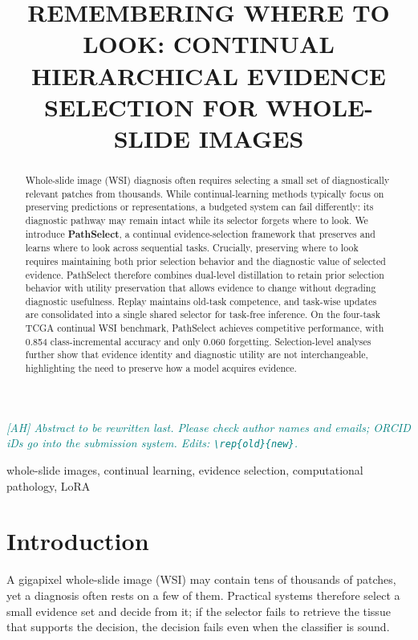 \documentclass{article}
\title{REMEMBERING WHERE TO LOOK: CONTINUAL HIERARCHICAL EVIDENCE SELECTION FOR WHOLE-SLIDE IMAGES}
\newcommand{\note}[1]{\textcolor{teal}{\textit{[AH] #1}}}     %
\begin{document}
\ninept
\maketitle

\note{Abstract to be rewritten last. Please check author names and emails; ORCID iDs go into the submission system. Edits: \texttt{\textbackslash rep\{old\}\{new\}}.}

\begin{abstract}
Whole-slide image (WSI) diagnosis often requires selecting a small set of diagnostically relevant patches from thousands. While continual-learning methods typically focus on preserving predictions or representations, a budgeted system can fail differently: its diagnostic pathway may remain intact while its selector forgets where to look. We introduce \textbf{PathSelect}, a continual evidence-selection framework that preserves and learns where to look across sequential tasks. Crucially, preserving where to look requires maintaining both prior selection behavior and the diagnostic value of selected evidence. PathSelect therefore combines dual-level distillation to retain prior selection behavior with utility preservation that allows evidence to change without degrading diagnostic usefulness. Replay maintains old-task competence, and task-wise updates are consolidated into a single shared selector for task-free inference. On the four-task TCGA continual WSI benchmark, PathSelect achieves competitive performance, with 0.854 class-incremental accuracy and only 0.060 forgetting. Selection-level analyses further show that evidence identity and diagnostic utility are not interchangeable, highlighting the need to preserve how a model acquires evidence.
\end{abstract}

\begin{keywords}
whole-slide images, continual learning, evidence selection, computational pathology, LoRA
\end{keywords}

\section{Introduction}
\label{sec:intro}

A gigapixel whole-slide image (WSI) may contain tens of thousands of patches, yet a diagnosis often rests on a few of them. Practical systems therefore select a small evidence set and decide from it; if the selector fails to retrieve the tissue that supports the decision, the decision fails even when the classifier is sound.
\end{document}
